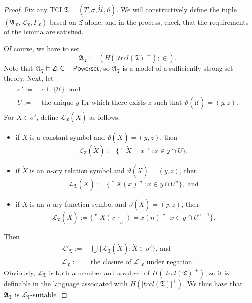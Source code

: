 \documentclass[12pt]{article}
\numberwithin{equation}{section}
\begin{document}
\begin{proof}
Fix any TCI $\mathfrak{T} = (T, \sigma, \dot{\mathcal{U}}, \vartheta)$. We will constructively define the tuple $(\mathfrak{A}_{\mathfrak{T}}, \mathcal{L}_{\mathfrak{T}}, \Gamma_{\mathfrak{T}})$ based on $\mathfrak{T}$ alone, and in the process, check that the requirements of the lemma are satisfied.

Of course, we have to set $$\mathfrak{A}_{\mathfrak{T}} := (H(|trcl(\mathfrak{T})|^+); \in).$$ Note that $\mathfrak{A}_{\mathfrak{T}} \models \mathsf{ZFC - Powerset}$, so $\mathfrak{A}_{\mathfrak{T}}$ is a model of a sufficiently strong set theory. Next, let
\begin{align*}
    \sigma' := \ & \sigma \cup \{\dot{\mathcal{U}}\} \text{, and} \\
    U := \ & \text{the unique } y \text{ for which there exists } z \text{ such that } \vartheta(\dot{\mathcal{U}}) = (y, z).
\end{align*}
For $\dot{X} \in \sigma'$, define $\mathcal{L}_{\mathfrak{T}}(\dot{X})$ as follows:
\begin{itemize}
    \item if $\dot{X}$ is a constant symbol and $\vartheta(\dot{X}) = (y, z)$, then $$\mathcal{L}_{\mathfrak{T}}(\dot{X}) := \{\ulcorner \dot{X} = x \urcorner : x \in y \cap U\},$$
    \item if $\dot{X}$ is an $n$-ary relation symbol and $\vartheta(\dot{X}) = (y, z)$, then $$\mathcal{L}_{\mathfrak{T}}(\dot{X}) := \{\ulcorner \dot{X}(x) \urcorner : x \in y \cap U^n\}, \text{ and}$$
    \item if $\dot{X}$ is an $n$-ary function symbol and $\vartheta(\dot{X}) = (y, z)$, then $$\mathcal{L}_{\mathfrak{T}}(\dot{X}) := \{\ulcorner \dot{X}(x \! \restriction_n) = x(n) \urcorner : x \in y \cap U^{n+1}\}.$$
\end{itemize}
Then 
\begin{align*}
    \mathcal{L}'_{\mathfrak{T}} := \ & \bigcup \{\mathcal{L}_{\mathfrak{T}}(\dot{X}) : \dot{X} \in \sigma'\} \text{, and} \\
    \mathcal{L}_{\mathfrak{T}} := \ & \text{the closure of }  \mathcal{L}'_{\mathfrak{T}} \text{ under negation.}
\end{align*}
Obviously, $\mathcal{L}_{\mathfrak{T}}$ is both a member and a subset of $H(|trcl(\mathfrak{T})|^+)$, so it is definable in the language associated with $H(|trcl(\mathfrak{T})|^+)$. We thus have that $\mathfrak{A}_{\mathfrak{T}}$ is $\mathcal{L}_{\mathfrak{T}}$-suitable.


\end{proof}
\end{document}
